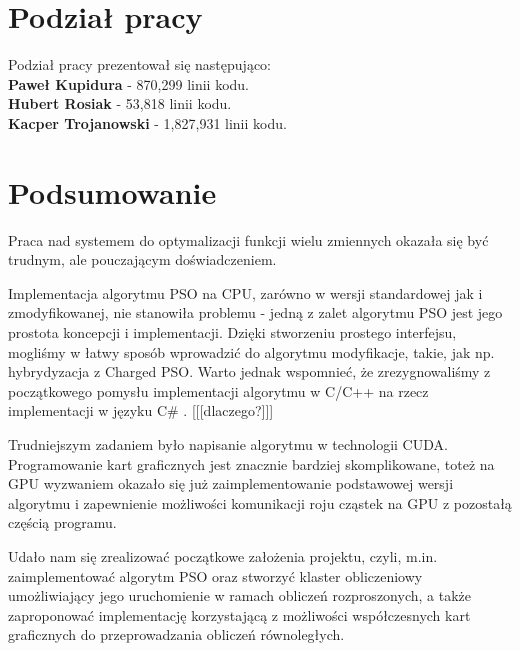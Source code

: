 \documentclass[12pt, twoside, openany, abstract=on]{report}
\theoremstyle{definition}
\begin{document}

\chapter{Podział pracy}
Podział pracy prezentował się następująco:\\

\textbf{Paweł Kupidura} - 870,299 linii kodu.\\

\textbf{Hubert Rosiak} - 53,818 linii kodu.\\

\textbf{Kacper Trojanowski} - 1,827,931 linii kodu.\\


\chapter{Podsumowanie}




Praca nad systemem do optymalizacji funkcji wielu zmiennych okazała się być trudnym, ale pouczającym doświadczeniem. 

Implementacja algorytmu PSO na CPU, zarówno w wersji standardowej jak i zmodyfikowanej, nie stanowiła problemu - jedną z zalet algorytmu PSO jest jego prostota koncepcji i implementacji. Dzięki stworzeniu prostego interfejsu, mogliśmy w łatwy sposób wprowadzić do algorytmu modyfikacje, takie, jak np. hybrydyzacja z Charged PSO. Warto jednak wspomnieć, że zrezygnowaliśmy z początkowego pomysłu implementacji algorytmu w C/C++ na rzecz implementacji w języku C\# . [[[dlaczego?]]]

Trudniejszym zadaniem było napisanie algorytmu w technologii CUDA. Programowanie kart graficznych jest znacznie bardziej skomplikowane, toteż na GPU wyzwaniem okazało się już zaimplementowanie podstawowej wersji algorytmu i zapewnienie możliwości komunikacji roju cząstek na GPU z pozostałą częścią programu.

Udało nam się zrealizować początkowe założenia projektu, czyli, m.in. zaimplementować algorytm PSO oraz stworzyć klaster obliczeniowy umożliwiający jego uruchomienie w ramach obliczeń rozproszonych, a także zaproponować implementację korzystającą z możliwości współczesnych kart graficznych do przeprowadzania obliczeń równoległych.
\end{document}
